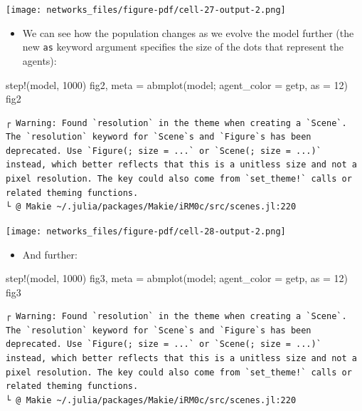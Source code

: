 \documentclass[
  letterpaper,
  DIV=11,
  numbers=noendperiod]{scrartcl}
\newenvironment{Shaded}{\begin{snugshade}}{\end{snugshade}}
\newcommand{\FloatTok}[1]{\textcolor[rgb]{0.68,0.00,0.00}{#1}}
\newcommand{\FunctionTok}[1]{\textcolor[rgb]{0.28,0.35,0.67}{#1}}
\newcommand{\NormalTok}[1]{\textcolor[rgb]{0.00,0.23,0.31}{#1}}
\newcommand{\OperatorTok}[1]{\textcolor[rgb]{0.37,0.37,0.37}{#1}}
\providecommand{\tightlist}{%
  \setlength{\itemsep}{0pt}\setlength{\parskip}{0pt}}\usepackage{longtable,booktabs,array}
\begin{document}
\texttt{[image: networks\_files/figure-pdf/cell-27-output-2.png]}

\begin{itemize}
\tightlist
\item
  We can see how the population changes as we evolve the model further
  (the new \texttt{as} keyword argument specifies the size of the dots
  that represent the agents):
\end{itemize}

\begin{Shaded}
\begin{Highlighting}[]
\FunctionTok{step!}\NormalTok{(model, }\FloatTok{1000}\NormalTok{)}
\NormalTok{fig2, meta }\OperatorTok{=} \FunctionTok{abmplot}\NormalTok{(model; agent\_color }\OperatorTok{=}\NormalTok{ getp, as }\OperatorTok{=} \FloatTok{12}\NormalTok{)}
\NormalTok{fig2}
\end{Highlighting}
\end{Shaded}

\begin{verbatim}
┌ Warning: Found `resolution` in the theme when creating a `Scene`. The `resolution` keyword for `Scene`s and `Figure`s has been deprecated. Use `Figure(; size = ...` or `Scene(; size = ...)` instead, which better reflects that this is a unitless size and not a pixel resolution. The key could also come from `set_theme!` calls or related theming functions.
└ @ Makie ~/.julia/packages/Makie/iRM0c/src/scenes.jl:220
\end{verbatim}

\texttt{[image: networks\_files/figure-pdf/cell-28-output-2.png]}

\begin{itemize}
\tightlist
\item
  And further:
\end{itemize}

\begin{Shaded}
\begin{Highlighting}[]
\FunctionTok{step!}\NormalTok{(model, }\FloatTok{1000}\NormalTok{)}
\NormalTok{fig3, meta }\OperatorTok{=} \FunctionTok{abmplot}\NormalTok{(model; agent\_color }\OperatorTok{=}\NormalTok{ getp, as }\OperatorTok{=} \FloatTok{12}\NormalTok{)}
\NormalTok{fig3}
\end{Highlighting}
\end{Shaded}

\begin{verbatim}
┌ Warning: Found `resolution` in the theme when creating a `Scene`. The `resolution` keyword for `Scene`s and `Figure`s has been deprecated. Use `Figure(; size = ...` or `Scene(; size = ...)` instead, which better reflects that this is a unitless size and not a pixel resolution. The key could also come from `set_theme!` calls or related theming functions.
└ @ Makie ~/.julia/packages/Makie/iRM0c/src/scenes.jl:220
\end{verbatim}
\end{document}
